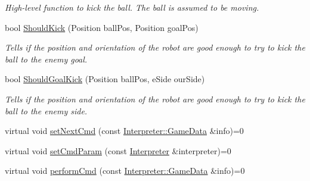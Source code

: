 \begin{DoxyCompactItemize}
\begin{DoxyCompactList}\small\item\em High-\/level function to kick the ball. The ball is assumed to be moving. \item\end{DoxyCompactList}\item 
bool \hyperlink{classTeamRobot_ac979572f4899940e88f067102ac1ae46}{ShouldKick} (Position ballPos, Position goalPos)
\begin{DoxyCompactList}\small\item\em Tells if the position and orientation of the robot are good enough to try to kick the ball to the enemy goal. \item\end{DoxyCompactList}\item 
bool \hyperlink{classTeamRobot_ae7f6fa303c865dad297b662731165883}{ShouldGoalKick} (Position ballPos, eSide ourSide)
\begin{DoxyCompactList}\small\item\em Tells if the position and orientation of the robot are good enough to try to kick the ball to the enemy side. \item\end{DoxyCompactList}\item 
virtual void \hyperlink{classTeamRobot_a65f9a2b7464dfac3f4a0336810cf574f}{setNextCmd} (const \hyperlink{structInterpreter_1_1GameData}{Interpreter::GameData} \&info)=0
\item 
virtual void \hyperlink{classTeamRobot_a34c0fd6986c510d4025e5752b3c0e49a}{setCmdParam} (const \hyperlink{classInterpreter}{Interpreter} \&interpreter)=0
\item 
virtual void \hyperlink{classTeamRobot_a9b84df51ca16a7203fdb6498ea6741da}{performCmd} (const \hyperlink{structInterpreter_1_1GameData}{Interpreter::GameData} \&info)=0
\end{DoxyCompactItemize}
